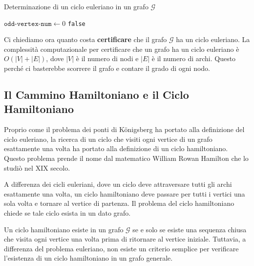 \begin{algorithm}[H]
    \SetAlgoLined
    
    \DontPrintSemicolon
    \caption{Determinazione di un ciclo euleriano in un grafo $\mathcal{G}$}
    \label{alg:eulero_algo}
    
    
    \BlankLine
    $\texttt{odd-vertex-num} \gets 0$\;
    \Return \texttt{false}\;
\end{algorithm}

Ci chiediamo ora quanto costa \textbf{certificare} che il grafo $\mathcal{G}$
ha un ciclo euleriano.
La complessità computazionale per certificare che un grafo ha un ciclo
euleriano è $O(|V|+|E|)$, dove $|V|$ è il numero di nodi e $|E|$ è il numero di archi.
Questo perché ci basterebbe scorrere il grafo e contare il grado di ogni nodo.

\subsection{Il Cammino Hamiltoniano e il Ciclo Hamiltoniano}
Proprio come il problema dei ponti di Königsberg ha portato alla definizione del ciclo
euleriano, la ricerca di un ciclo che visiti ogni vertice di un grafo esattamente
una volta ha portato alla definizione di un ciclo hamiltoniano. Questo problema
prende il nome dal matematico William Rowan Hamilton che lo studiò nel XIX secolo.

A differenza dei cicli euleriani, dove un ciclo deve attraversare tutti gli archi
esattamente una volta, un ciclo hamiltoniano deve passare per tutti i vertici una
sola volta e tornare al vertice di partenza. Il problema del ciclo hamiltoniano
chiede se tale ciclo esista in un dato grafo.

\begin{pastelbox3}[title=Problema del Ciclo Hamiltoniano]
    Un ciclo hamiltoniano esiste in un grafo $\mathcal{G}$ se e solo se esiste una
    sequenza chiusa che
    visita ogni vertice una volta prima di ritornare al vertice iniziale. Tuttavia, a
    differenza del problema euleriano, non esiste un criterio semplice per verificare
    l'esistenza di un ciclo hamiltoniano in un grafo generale.
\end{pastelbox3}

